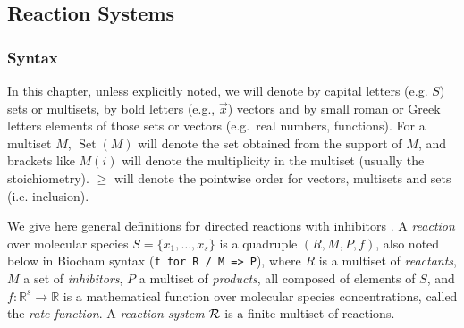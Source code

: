 \documentclass[graybox]{svmult}
\DeclareMathOperator{\Set}{Set}
\begin{document}
\subsection{Reaction Systems}




\subsubsection{Syntax}

In this chapter, unless explicitly noted, we will denote by capital letters
(e.g. $S$) sets or multisets, by bold letters (e.g., $\vec x$) vectors and by
small roman or Greek letters elements of those sets or vectors (e.g.~real
numbers, functions).
For a multiset $M$, $\Set(M)$ will denote the set obtained from the support of
$M$, and brackets like $M(i)$ will denote the multiplicity in the multiset (usually
the stoichiometry).
$\geq$ will denote the pointwise order for vectors, multisets and sets (i.e.
inclusion).

We give here general definitions for directed reactions with inhibitors \cite{FGS15tcs}.
A \emph{reaction} over molecular species $S = \{x_1,\dots,x_s\}$
is a quadruple $(R,M,P,f)$, also noted below in Biocham syntax ({\small\verb|f for R / M => P|}), 
where $R$ is a multiset of \emph{reactants}, $M$ a set of \emph{inhibitors},
$P$ a multiset of \emph{products}, all composed of elements of $S$,
and $f:\mathbb{R}^s\rightarrow\mathbb{R}$
is a mathematical function over molecular species concentrations, called the \emph{rate function}.
A \emph{reaction system} $\cal R$ is a finite multiset of reactions.
\end{document}
